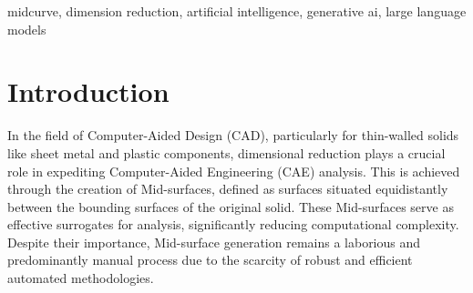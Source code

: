 \documentclass[conference]{IEEEtran}
\begin{document}



\begin{IEEEkeywords}
midcurve, dimension reduction, artificial intelligence, generative ai, large language models
\end{IEEEkeywords}

\section{Introduction}
\label{sec:1}
In the field of Computer-Aided Design (CAD), particularly for thin-walled solids like sheet metal and plastic components, dimensional reduction plays a crucial role in expediting Computer-Aided Engineering (CAE) analysis. This is achieved through the creation of Mid-surfaces, defined as surfaces situated equidistantly between the bounding surfaces of the original solid. These Mid-surfaces serve as effective surrogates for analysis, significantly reducing computational complexity. Despite their importance, Mid-surface generation remains a laborious and predominantly manual process due to the scarcity of robust and efficient automated methodologies\cite{medial2010}.
\end{document}
